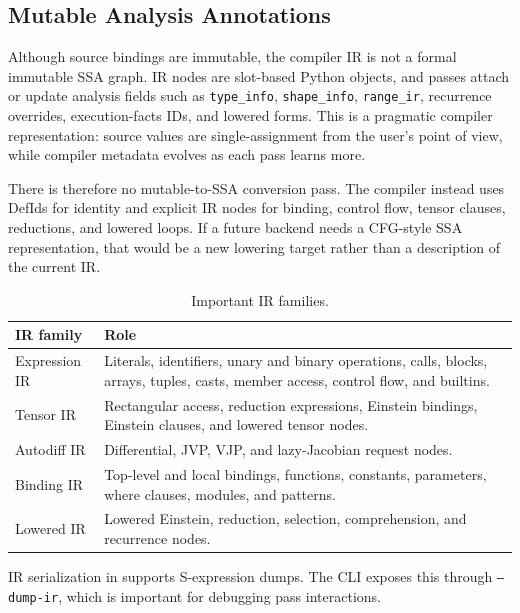 \subsection{Mutable Analysis Annotations}

Although \einlang{} source bindings are immutable, the compiler IR is not a
formal immutable SSA graph. IR nodes are slot-based Python objects, and passes
attach or update analysis fields such as \texttt{type\_info},
\texttt{shape\_info}, \texttt{range\_ir}, recurrence overrides, execution-facts
IDs, and lowered forms. This is a pragmatic compiler representation: source
values are single-assignment from the user's point of view, while compiler
metadata evolves as each pass learns more.

There is therefore no mutable-to-SSA conversion pass. The compiler instead uses
DefIds for identity and explicit IR nodes for binding, control flow, tensor
clauses, reductions, and lowered loops. If a future backend needs a CFG-style
SSA representation, that would be a new lowering target rather than a
description of the current IR.

\begin{table}[htbp]
\centering
\caption{Important IR families.}
\label{tab:ir-families}
\renewcommand{\arraystretch}{1.08}
\small
\begin{tabular}{@{}L{0.32\textwidth}L{0.56\textwidth}@{}}
\toprule
IR family & Role \\
\midrule
Expression IR & Literals, identifiers, unary and binary operations, calls, blocks, arrays, tuples, casts, member access, control flow, and builtins. \\
Tensor IR & Rectangular access, reduction expressions, Einstein bindings, Einstein clauses, and lowered tensor nodes. \\
Autodiff IR & Differential, JVP, VJP, and lazy-Jacobian request nodes. \\
Binding IR & Top-level and local bindings, functions, constants, parameters, where clauses, modules, and patterns. \\
Lowered IR & Lowered Einstein, reduction, selection, comprehension, and recurrence nodes. \\
\bottomrule
\end{tabular}
\end{table}

IR serialization in  supports
S-expression dumps. The CLI exposes this through \texttt{--dump-ir}, which is
important for debugging pass interactions.

